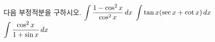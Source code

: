 다음 부정적분을 구하시오.
 $\displaystyle\int \dfrac{1-\cos^2 x}{\cos^2 x}\mkern3mu dx$
 $\displaystyle\int \tan x(\sec x+\cot x)\mkern3mu dx$
 $\displaystyle\int \dfrac{\cos^2 x}{1+\sin x}\mkern3mu dx$
